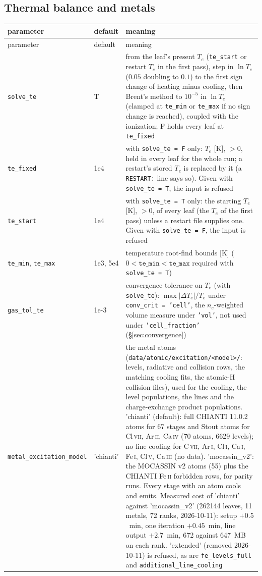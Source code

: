 \documentclass[english,a4paper]{my_memo}
\newcommand{\code}[1]{\texttt{#1}}
\begin{document}
\subsection{Thermal balance and metals}
{\small
\begin{longtable}{llp{7.2cm}}
\toprule
parameter & default & meaning \\
\midrule
\endfirsthead
\toprule
parameter & default & meaning \\
\midrule
\endhead
\bottomrule
\endlastfoot
\code{solve\_te} & T & from the leaf's present $T_e$ (\code{te\_start} or restart $T_e$ in the first pass), step in $\ln T_e$ ($0.05$ doubling to $0.1$) to the first sign change of heating minus cooling, then Brent's method to $10^{-5}$ in $\ln T_e$ (clamped at \code{te\_min} or \code{te\_max} if no sign change is reached), coupled with the ionization; F holds every leaf at \code{te\_fixed} \\
\code{te\_fixed} & 1e4 & with \code{solve\_te = F} only: $T_e$ [K], $> 0$, held in every leaf for the whole run; a restart's stored $T_e$ is replaced by it (a \code{RESTART:} line says so).  Given with \code{solve\_te = T}, the input is refused \\
\code{te\_start} & 1e4 & with \code{solve\_te = T} only: the starting $T_e$ [K], $> 0$, of every leaf (the $T_e$ of the first pass) unless a restart file supplies one.  Given with \code{solve\_te = F}, the input is refused \\
\code{te\_min}, \code{te\_max} & 1e3, 5e4 & temperature root-find bounds [K] ($0 < \code{te\_min} < \code{te\_max}$ required with \code{solve\_te = T}) \\
\code{gas\_tol\_te} & 1e-3 & convergence tolerance on $T_e$ (with \code{solve\_te}): $\max|\Delta T_e|/T_e$ under \code{conv\_crit = 'cell'}, the $n_e$-weighted volume measure under \code{'vol'}, not used under \code{'cell\_fraction'} (\S\ref{sec:convergence}) \\
\code{metal\_excitation\_model} & 'chianti' & the metal atoms (\code{data/atomic/excitation/<model>/}: levels, radiative and collision rows, the matching cooling fits, the atomic-H collision files), used for the cooling, the level populations, the lines and the charge-exchange product populations.  'chianti' (default): full CHIANTI 11.0.2 atoms for 67 stages and Stout atoms for Cl\,\textsc{vii}, Ar\,\textsc{ii}, Ca\,\textsc{iv} (70 atoms, 6629 levels); no line cooling for C\,\textsc{vii}, Ar\,\textsc{i}, Cl\,\textsc{i}, Ca\,\textsc{i}, Fe\,\textsc{i}, Cl\,\textsc{v}, Ca\,\textsc{iii} (no data).  'mocassin\_v2': the MOCASSIN v2 atoms (55) plus the CHIANTI Fe\,\textsc{ii} forbidden rows, for parity runs.  Every stage with an atom cools and emits.  Measured cost of 'chianti' against 'mocassin\_v2' (262144 leaves, 11 metals, 72 ranks, 2026-10-11): setup $+0.5$~min, one iteration $+0.45$~min, line output $+2.7$~min, 672 against 647~MB on each rank.  'extended' (removed 2026-10-11) is refused, as are \code{fe\_levels\_full} and \code{additional\_line\_cooling} \\

\end{longtable}}
\end{document}
